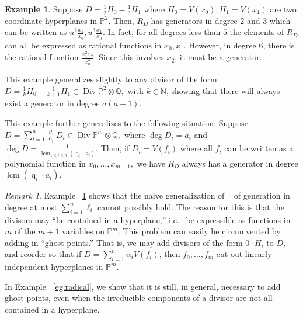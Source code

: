 \documentclass{amsart}
\theoremstyle{plain}
\theoremstyle{definition}
\newtheorem{example}[thm]{Example}
\theoremstyle{remark}
\newtheorem{rem}[thm]{Remark}
\numberwithin{equation}{section}
\newcommand\bn{{\mathbb N}}
\newcommand\bq{{\mathbb Q}}
\newcommand\bp{{\mathbb P}}
\DeclareMathOperator\di{Div}
\newcommand\bida{a}
\DeclareMathOperator{\num}{p}
\DeclareMathOperator{\den}{q}
\DeclareMathOperator{\lcm}{lcm}
\begin{document}
\begin{example}
\label{eg:hyperplane}
Suppose $D = \frac{1}{2}H_0 - \frac{1}{3}H_1$ where $H_0 = V(x_0),
H_1 = V(x_1)$ are two coordinate hyperplanes in $\bp^2$. Then, $R_D$
has generators in degree $2$ and $3$ which can be written as $u^2
\frac{x_1}{x_0}, u^3 \frac{x_1}{x_0}.$ In fact, for all degrees
less than $5$ the elements of $R_D$ can all be expressed as
rational functions in $x_0, x_1$. However, in degree $6$, there is
the rational function $\frac{x_1^2 x_2}{x_0^3}$. Since this
involves $x_2$, it must be a generator.

This example generalizes slightly to any divisor of the form $D =
\frac{1}{k}H_0 - \frac{1}{k+1}H_1 \in \di \bp^2 \otimes \bq,$ with
$k \in \bn$, showing that there will always exist a generator in
degree $a(a + 1)$.

This example further generalizes to the following situation:
Suppose $D = \sum_{i=1}^{n} \frac{\num_i}{\den_i}D_i \in \di \bp^m
\otimes \bq,$ where $\deg D_i = \bida_i$ and $\deg D = \frac{1}{\lcm
_{1 \leq i \leq n}(\den_i \cdot \bida_i)}$. Then, if $D_i = V(f_i)$
where all $f_i$ can be written as a polynomial function in $x_0,
\ldots, x_{m-1},$ we have $R_D$ always has a generator in degree
$\lcm(\den_i \cdot \bida_i)$.
\end{example}

\begin{rem}
\label{rem:ghost-motivation}
Example ~\ref{eg:hyperplane} shows that the naive generalization of
~\cite[Theorem 8]{dorney:canonical} of generation in degree at most
$\sum_{i=1}^{n}\ell_i$ cannot possibly hold. The reason for this is
that the divisors may ``be contained in a hyperplane,'' i.e.~ be
expressible as functions in $m$ of the $m+1$ variables on $\bp^m$.
This problem can easily be circumvented by adding in ``ghost
points.'' That is, we may add divisors of the form $0 \cdot H_i$ to
$D$, and reorder so that if $D = \sum_{i=1}^{n}\alpha_i V(f_i)$,
then $f_0, \ldots, f_m$ cut out linearly independent
hyperplanes in $\bp^m$.

In Example ~\ref{eg:radical}, we show that it is still, in general,
necessary to add ghost points, even when the irreducible components
of a divisor are not all contained in a hyperplane.
\end{rem}
\end{document}
